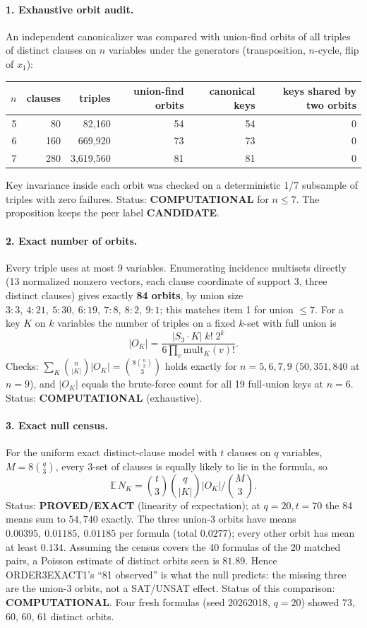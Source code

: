\documentclass[11pt]{article}
\begin{document}
\paragraph{1. Exhaustive orbit audit.} An independent canonicalizer was compared with union-find orbits of all triples of distinct clauses on $n$ variables under the generators (transposition, $n$-cycle, flip of $x_1$):
\begin{center}\begin{tabular}{rrrrrr}\toprule
$n$ & clauses & triples & union-find orbits & canonical keys & keys shared by two orbits\\\midrule
5 & 80 & 82{,}160 & 54 & 54 & 0\\
6 & 160 & 669{,}920 & 73 & 73 & 0\\
7 & 280 & 3{,}619{,}560 & 81 & 81 & 0\\\bottomrule
\end{tabular}\end{center}
Key invariance inside each orbit was checked on a deterministic 1/7 subsample of triples with zero failures.
Status: \textbf{COMPUTATIONAL} for $n\le7$. The proposition keeps the peer label \textbf{CANDIDATE}.

\paragraph{2. Exact number of orbits.} Every triple uses at most 9 variables. Enumerating incidence multisets directly (13 normalized nonzero vectors, each clause coordinate of support 3, three distinct clauses) gives exactly \textbf{84 orbits}, by union size $3{:}3,\ 4{:}21,\ 5{:}30,\ 6{:}19,\ 7{:}8,\ 8{:}2,\ 9{:}1$; this matches item 1 for union $\le7$.
For a key $K$ on $k$ variables the number of triples on a fixed $k$-set with full union is
\[
|O_K|=\frac{|S_3\cdot K|\;k!\;2^k}{6\prod_{v}\mathrm{mult}_K(v)!}.
\]
Checks: $\sum_K\binom{n}{|K|}|O_K|=\binom{8\binom n3}{3}$ holds exactly for $n=5,6,7,9$ ($50{,}351{,}840$ at $n=9$), and $|O_K|$ equals the brute-force count for all 19 full-union keys at $n=6$.
Status: \textbf{COMPUTATIONAL} (exhaustive).

\paragraph{3. Exact null census.} For the uniform exact distinct-clause model with $t$ clauses on $q$ variables, $M=8\binom q3$, every 3-set of clauses is equally likely to lie in the formula, so
\[
\mathbb E\,N_K=\binom t3\binom q{|K|}|O_K|\Big/\binom M3 .
\]
Status: \textbf{PROVED/EXACT} (linearity of expectation); at $q=20,t=70$ the 84 means sum to $54{,}740$ exactly.
The three union-3 orbits have means $0.00395,\ 0.01185,\ 0.01185$ per formula (total $0.0277$); every other orbit has mean at least $0.134$. Assuming the census covers the 40 formulas of the 20 matched pairs, a Poisson estimate of distinct orbits seen is $81.89$. Hence ORDER3EXACT1's ``81 observed'' is what the null predicts: the missing three are the union-3 orbits, not a SAT/UNSAT effect. Status of this comparison: \textbf{COMPUTATIONAL}. Four fresh formulas (seed 20262018, $q=20$) showed 73, 60, 60, 61 distinct orbits.
\end{document}
